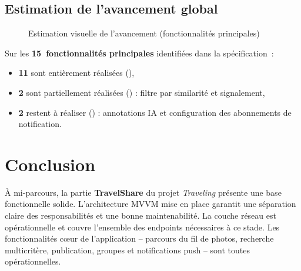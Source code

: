 \documentclass[12pt, a4paper]{report}
\newcommand{\cmark}{\textcolor{success}{\ding{51}}}
\newcommand{\xmark}{\textcolor{danger}{\ding{55}}}
\newcommand{\pmark}{\textcolor{warning}{\ding{119}}}
\begin{document}
\section{Estimation de l'avancement global}

\begin{figure}[H]
\centering
{}
\caption{Estimation visuelle de l'avancement (fonctionnalités principales)}
\label{fig:progress}
\end{figure}

Sur les \textbf{15~fonctionnalités principales} identifiées dans la spécification~:
\begin{itemize}
  \item \textbf{11} sont entièrement réalisées (\cmark),
  \item \textbf{2} sont partiellement réalisées (\pmark) : filtre par similarité et signalement,
  \item \textbf{2} restent à réaliser (\xmark) : annotations IA et configuration des abonnements de notification.
\end{itemize}

\chapter{Conclusion}

À mi-parcours, la partie \textbf{TravelShare} du projet \emph{Traveling} présente une base
fonctionnelle solide. L'architecture MVVM mise en place garantit une séparation claire des
responsabilités et une bonne maintenabilité. La couche réseau est opérationnelle et couvre
l'ensemble des endpoints nécessaires à ce stade. Les fonctionnalités cœur de l'application
-- parcours du fil de photos, recherche multicritère, publication, groupes et notifications
push -- sont toutes opérationnelles.
\end{document}
